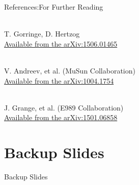 \documentclass{beamer}
\begin{document}
\begin{frame}{References:}{For Further Reading}
  \begin{thebibliography}{10}
    
  \beamertemplatearticlebibitems

      \\
     T. Gorringe, D. Hertzog \\
    \href{http://arxiv.org/abs/1506.01465}{Available from the arXiv:1506.01465}

      \\
     V. Andreev, et al. (MuSun Collaboration) \\
    \href{http://arxiv.org/pdf/1004.1754.pdf}{Available from the arXiv:1004.1754}
    
      \\
     J. Grange, et al. (E989 Collaboration) \\
    \href{http://arxiv.org/abs/1501.06858}{Available from the arXiv:1501.06858}
    



  \beamertemplatebookbibitems


      \end{thebibliography}
\end{frame}



\section*{Backup Slides}

\begin{frame}{Backup Slides}
    
\end{frame}
\end{document}
